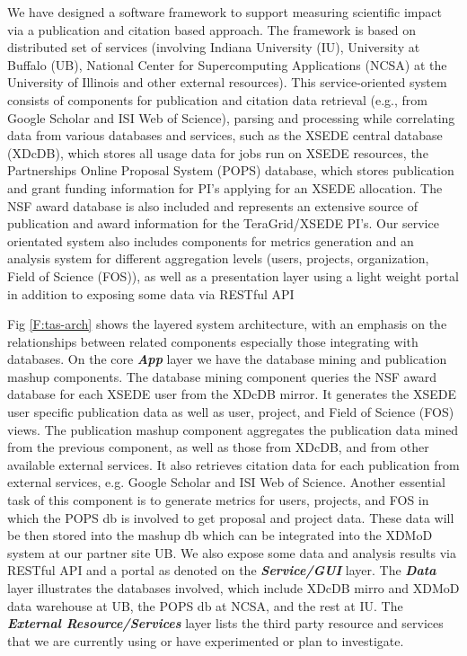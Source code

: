 \documentclass{sig-alternate}
\begin{document}
We have designed a software framework to support measuring scientific impact via a publication and citation based approach. The framework is based on distributed set of services (involving Indiana University (IU), University at Buffalo (UB), National Center for Supercomputing Applications (NCSA) at the University of Illinois and other external resources). This service-oriented system consists of components for publication and citation data retrieval (e.g., from Google Scholar and ISI Web of Science), parsing and processing while correlating data from various databases and services, such as the XSEDE central database (XDcDB), which stores all usage data for jobs run on XSEDE resources, the Partnerships Online Proposal System (POPS) database, which stores publication and grant funding information for PI’s applying for an XSEDE allocation. The NSF award database is also included and represents an extensive source of publication and award information for the TeraGrid/XSEDE PI’s.  Our service orientated system also includes components for metrics generation and an analysis system for different aggregation levels (users, projects, organization, Field of Science (FOS)), as well as a presentation layer using a light weight portal in addition to exposing some data via RESTful API
 
Fig \ref{F:tas-arch} shows the layered system architecture, with an emphasis on the relationships between related components especially those integrating with databases. On the core \emph{\textbf{App}} layer we have the database mining and publication mashup components. The database mining component queries the NSF award database for each XSEDE user from the XDcDB mirror. It generates the XSEDE user specific publication data as well as user, project, and Field of Science (FOS) views. The publication mashup component aggregates the publication data mined from the previous component, as well as those from XDcDB, and from other available external services. It also retrieves citation data for each publication from external services, e.g. Google Scholar and ISI Web of Science. Another essential task of this component is to generate metrics for users, projects, and FOS in which the POPS db is involved to get proposal and project data. These data will be then stored into the mashup db which can be integrated into the XDMoD \cite{CPE:CPE2871} system at our partner site UB. We also expose some data and analysis results via RESTful API and a portal as denoted on the \emph{\textbf{Service/GUI}} layer. The \emph{\textbf{Data}} layer illustrates the databases involved, which include XDcDB mirro and XDMoD data warehouse at UB, the POPS db at NCSA, and the rest at IU. The \emph{\textbf{External Resource/Services}} layer lists the third party resource and services that we are currently using or have experimented or plan to investigate.
\end{document}
